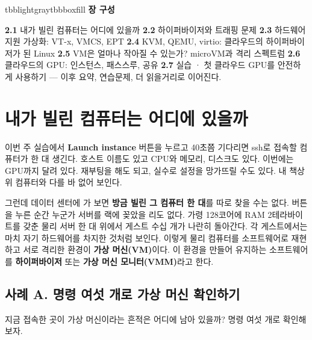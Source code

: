 \vspace{5.0pt}

\begin{calloutbox}{tbblightgray}{tbbboxfill}
{\normalsize\bfseries\color{tbbink}장 구성}\par\vspace{3pt}
\textbf{2.1} 내가 빌린 컴퓨터는 어디에 있을까    \textbf{2.2} 하이퍼바이저와 트래핑 문제    \textbf{2.3} 하드웨어 지원 가상화: VT-x, VMCS, EPT    \textbf{2.4} KVM, QEMU, virtio: 클라우드의 하이퍼바이저가 된 Linux    \textbf{2.5} VM은 얼마나 작아질 수 있는가? microVM과 격리 스펙트럼    \textbf{2.6} 클라우드의 GPU: 인스턴스, 패스스루, 공유    \textbf{2.7} 실습 · 첫 클라우드 GPU를 안전하게 사용하기 — 이후 요약, 연습문제, 더 읽을거리로 이어진다.
\end{calloutbox}

\section{내가 빌린 컴퓨터는 어디에 있을까}

이번 주 실습에서 \textbf{Launch instance} 버튼을 누르고 40초쯤 기다리면 ssh로 접속할 컴퓨터가 한 대 생긴다. 호스트 이름도 있고 CPU와 메모리, 디스크도 있다. 이번에는 GPU까지 달려 있다. 재부팅을 해도 되고, 실수로 설정을 망가뜨릴 수도 있다. 내 책상 위 컴퓨터와 다를 바 없어 보인다.

그런데 데이터 센터에 가 보면 \textbf{방금 빌린 그 컴퓨터 한 대}를 따로 찾을 수는 없다. 버튼을 누른 순간 누군가 서버를 랙에 꽂았을 리도 없다. 가령 128코어에 RAM 2테라바이트를 갖춘 물리 서버 한 대 위에서 게스트 수십 개가 나란히 돌아간다. 각 게스트에서는 마치 자기 하드웨어를 차지한 것처럼 보인다. 이렇게 물리 컴퓨터를 소프트웨어로 재현하고 서로 격리한 환경이 \textbf{가상 머신(VM)}이다. 이 환경을 만들어 유지하는 소프트웨어를 \textbf{하이퍼바이저} 또는 \textbf{가상 머신 모니터(VMM)}라고 한다.

\subsection*{사례 A. 명령 여섯 개로 가상 머신 확인하기}

지금 접속한 곳이 가상 머신이라는 흔적은 어디에 남아 있을까? 명령 여섯 개로 확인해 보자.

